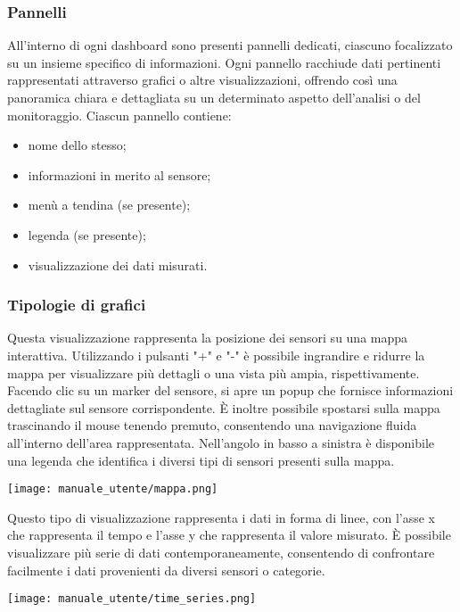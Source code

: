 \subsubsection{Pannelli}
All'interno di ogni dashboard sono presenti pannelli dedicati, ciascuno focalizzato su un insieme specifico di informazioni. Ogni pannello racchiude dati pertinenti rappresentati attraverso grafici o altre visualizzazioni, offrendo così una panoramica chiara e dettagliata su un determinato aspetto dell'analisi o del monitoraggio. Ciascun pannello contiene:
\begin{itemize}
    \item nome dello stesso;
    \item informazioni in merito al sensore;
    \item menù a tendina (se presente);
    \item legenda (se presente);
    \item visualizzazione dei dati misurati.
\end{itemize}

\subsubsection{Tipologie di grafici}
Questa visualizzazione rappresenta la posizione dei sensori su una mappa interattiva. Utilizzando i pulsanti "+" e "-" è possibile ingrandire e ridurre la mappa per visualizzare più dettagli o una vista più ampia, rispettivamente. Facendo clic su un marker del sensore, si apre un popup che fornisce informazioni dettagliate sul sensore corrispondente. È inoltre possibile spostarsi sulla mappa trascinando il mouse tenendo premuto, consentendo una navigazione fluida all'interno dell'area rappresentata. Nell'angolo in basso a sinistra è disponibile una legenda che identifica i diversi tipi di sensori presenti sulla mappa.
\begin{center}
    \texttt{[image: manuale\_utente/mappa.png]}
\end{center}

Questo tipo di visualizzazione rappresenta i dati in forma di linee, con l'asse x che rappresenta il tempo e l'asse y che rappresenta il valore misurato. È possibile visualizzare più serie di dati contemporaneamente, consentendo di confrontare facilmente i dati provenienti da diversi sensori o categorie.
\begin{center}
    \texttt{[image: manuale\_utente/time\_series.png]}
\end{center} 

